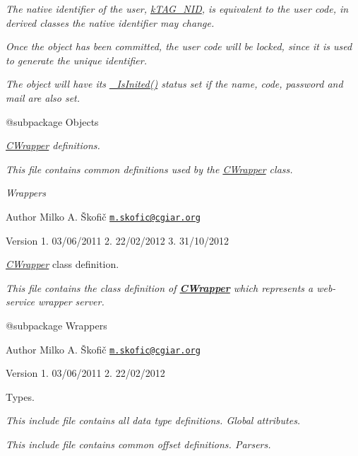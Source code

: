 {\itshape The native identifier of the user, \hyperlink{}{k\-T\-A\-G\-\_\-\-N\-I\-D}, is equivalent to the user code, in derived classes the native identifier may change.}

{\itshape Once the object has been committed, the user code will be locked, since it is used to generate the unique identifier.}

{\itshape The object will have its \hyperlink{}{\-\_\-\-Is\-Inited()} status set if the name, code, password and mail are also set.}

{\itshape \begin{DoxyVerb} @subpackage        Objects\end{DoxyVerb}
}

{\itshape \hyperlink{class_c_wrapper}{C\-Wrapper} definitions.}

{\itshape This file contains common definitions used by the \hyperlink{class_c_wrapper}{C\-Wrapper} class.}

{\itshape  Wrappers}

{\itshape \begin{DoxyAuthor}{Author}
Milko A. Škofič \href{mailto:m.skofic@cgiar.org}{\tt m.\-skofic@cgiar.\-org} 
\end{DoxyAuthor}
\begin{DoxyVersion}{Version}
1. 03/06/2011 2. 22/02/2012 3. 31/10/2012
\end{DoxyVersion}
{\itshape \hyperlink{class_c_wrapper}{C\-Wrapper}} class definition.}

{\itshape This file contains the class definition of {\bfseries \hyperlink{class_c_wrapper}{C\-Wrapper}} which represents a web-\/service wrapper server.}

{\itshape \begin{DoxyVerb} @subpackage        Wrappers
\end{DoxyVerb}
}

{\itshape \begin{DoxyAuthor}{Author}
Milko A. Škofič \href{mailto:m.skofic@cgiar.org}{\tt m.\-skofic@cgiar.\-org} 
\end{DoxyAuthor}
\begin{DoxyVersion}{Version}
1. 03/06/2011 2. 22/02/2012
\end{DoxyVersion}
Types.}

{\itshape This include file contains all data type definitions. Global attributes.}

{\itshape This include file contains common offset definitions. Parsers.}

